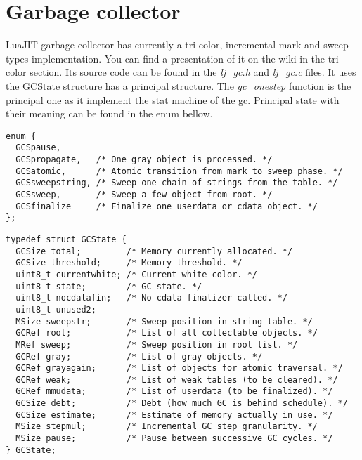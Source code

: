 \section{Garbage collector}
\label{Sec:gc}

LuaJIT garbage collector has currently a tri-color, incremental mark and sweep
types implementation. You can find a presentation of it on the wiki
\cite{luajit-gc} in the tri-color section. Its source code can be found in the
\emph{lj\_gc.h} and \emph{lj\_gc.c} files. It uses the GCState structure has a
principal structure. The \emph{gc\_onestep} function is the principal one as it
implement the stat machine of the gc. Principal state with their meaning can be
found in the enum bellow.

\begin{lstlisting}[style=CStyle]
enum {
  GCSpause,
  GCSpropagate,   /* One gray object is processed. */
  GCSatomic,      /* Atomic transition from mark to sweep phase. */
  GCSsweepstring, /* Sweep one chain of strings from the table. */
  GCSsweep,       /* Sweep a few object from root. */
  GCSfinalize     /* Finalize one userdata or cdata object. */
};
\end{lstlisting}

\begin{lstlisting}[style=CStyle]
typedef struct GCState {
  GCSize total;         /* Memory currently allocated. */
  GCSize threshold;     /* Memory threshold. */
  uint8_t currentwhite; /* Current white color. */
  uint8_t state;        /* GC state. */
  uint8_t nocdatafin;   /* No cdata finalizer called. */
  uint8_t unused2;
  MSize sweepstr;       /* Sweep position in string table. */
  GCRef root;           /* List of all collectable objects. */
  MRef sweep;           /* Sweep position in root list. */
  GCRef gray;           /* List of gray objects. */
  GCRef grayagain;      /* List of objects for atomic traversal. */
  GCRef weak;           /* List of weak tables (to be cleared). */
  GCRef mmudata;        /* List of userdata (to be finalized). */
  GCSize debt;          /* Debt (how much GC is behind schedule). */
  GCSize estimate;      /* Estimate of memory actually in use. */
  MSize stepmul;        /* Incremental GC step granularity. */
  MSize pause;          /* Pause between successive GC cycles. */
} GCState;
\end{lstlisting}

